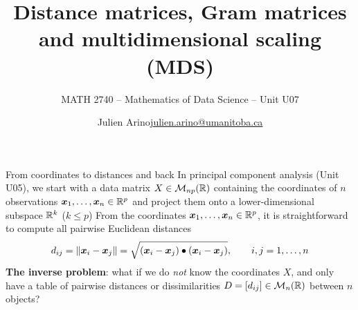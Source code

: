 \documentclass[aspectratio=169]{beamer}\usepackage[]{graphicx}\usepackage[]{xcolor}
\subtitle{MATH 2740 -- Mathematics of Data Science -- Unit U07}
\author{\texorpdfstring{Julien Arino\newline\url{julien.arino@umanitoba.ca}}{Julien Arino}}
\institute{Department of Mathematics @ University of Manitoba}
\title{Distance matrices, Gram matrices and multidimensional scaling (MDS)}
\begin{document}
\setcounter{theorem}{94}

\SStitlepage
\SSoutlinepage



\begin{frame}{From coordinates to distances and back}
In principal component analysis (Unit U05), we start with a data matrix $X\in\mathcal{M}_{np}(\mathbb{R})$ containing the coordinates of $n$ observations $\bm{x}_1,\ldots,\bm{x}_n\in\mathbb{R}^p$ and project them onto a lower-dimensional subspace $\mathbb{R}^k$ ($k\le p$)
\vfill
From the coordinates $\bm{x}_1,\ldots,\bm{x}_n\in\mathbb{R}^p$, it is straightforward to compute all pairwise Euclidean distances
\[
d_{ij} = \|\bm{x}_i - \bm{x}_j\| = \sqrt{(\bm{x}_i - \bm{x}_j)\bullet(\bm{x}_i - \bm{x}_j)}, \qquad i,j=1,\ldots,n
\]
\vfill
\textbf{The inverse problem}: what if we do \emph{not} know the coordinates $X$, and only have a table of pairwise distances or dissimilarities $D = [d_{ij}]\in\mathcal{M}_n(\mathbb{R})$ between $n$ objects?
\end{frame}
\end{document}
